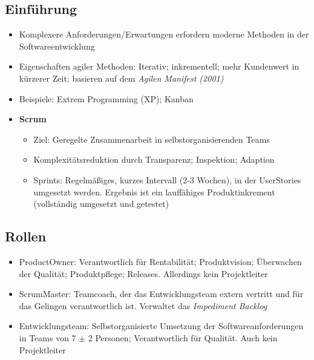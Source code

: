 \subsection{Einführung}
\begin{itemize}
	\item Komplexere Anforderungen/Erwartungen erfordern moderne Methoden in der Softwareentwicklung
	\item Eigenschaften agiler Methoden: Iterativ; inkrementell; mehr Kundenwert in kürzerer Zeit; basieren auf dem \textit{Agilen Manifest (2001)}
	\item Beispiele: Extrem Programming (XP); Kanban
	\item \textbf{Scrum}
	\begin{itemize}
		\item Ziel: Geregelte Zusammenarbeit in selbstorganisierenden Teams
		\item Komplexitätsreduktion durch Transparenz; Inspektion; Adaption
		\item Sprints: Regelmäßiges, kurzes Intervall (2-3 Wochen), in der UserStories umgesetzt werden. Ergebnis ist ein lauffähiges Produktinkrement (vollständig umgesetzt und getestet)
	\end{itemize}
\end{itemize}


\subsection{Rollen}
\begin{itemize}
	\item ProductOwner: Verantwortlich für Rentabilität; Produktvision; Überwachen der Qualität; Produktpflege; Releases. Allerdings kein Projektleiter
	\item ScrumMaster: Teamcoach, der das Entwicklungsteam extern vertritt und für das Gelingen verantwortlich ist. Verwaltet das \textit{Impediment Backlog}
	\item Entwicklungsteam: Selbstorganisierte Umsetzung der Softwareanforderungen in Teams von 7 \(\pm\) 2 Personen; Verantwortlich für Qualität. Auch kein Projektleiter
\end{itemize}



